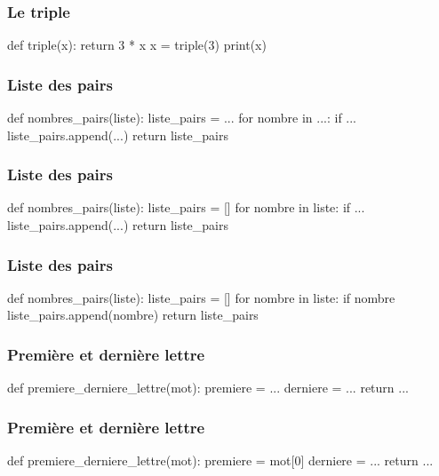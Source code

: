\documentclass{beamer}
\begin{document}
\begin{frame}[fragile]
   \frametitle{Le triple}

   \begin{pyverbatim}
         def triple(x):
            return 3 * x
         x = triple(3)
         print(x)
   \end{pyverbatim}
\end{frame}


\begin{frame}[fragile]
   \frametitle{Liste des pairs}

   \begin{pyverbatim}
         def nombres_pairs(liste):
            liste_pairs = ...
            for nombre in ...:
               if ...
                  liste_pairs.append(...)
            return liste_pairs
   \end{pyverbatim}
\end{frame}

\begin{frame}[fragile]
   \frametitle{Liste des pairs}

   \begin{pyverbatim}
         def nombres_pairs(liste):
            liste_pairs = []
            for nombre in liste:
               if ...
                  liste_pairs.append(...)
            return liste_pairs
   \end{pyverbatim}
\end{frame}


\begin{frame}[fragile]
   \frametitle{Liste des pairs}

   \begin{pyverbatim}
         def nombres_pairs(liste):
            liste_pairs = []
            for nombre in liste:
               if nombre %
                  liste_pairs.append(nombre)
            return liste_pairs
   \end{pyverbatim}
\end{frame}

\begin{frame}[fragile]
   \frametitle{Première et dernière lettre}

   \begin{pyverbatim}
      def premiere_derniere_lettre(mot):
         premiere = ...
         derniere = ...
         return ...
   \end{pyverbatim}
\end{frame}

\begin{frame}[fragile]
   \frametitle{Première et dernière lettre}

   \begin{pyverbatim}
      def premiere_derniere_lettre(mot):
         premiere = mot[0]
         derniere = ...
         return ...
   \end{pyverbatim}
\end{frame}
\end{document}
